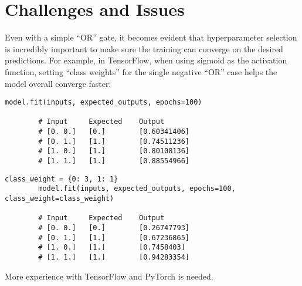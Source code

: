 \documentclass{article}
\begin{document}
    \section*{Challenges and Issues}
    Even with a simple ``OR'' gate, it becomes evident that hyperparameter selection is incredibly important to make
    sure the training can converge on the desired predictions.
    For example, in TensorFlow, when using sigmoid as the activation function, setting ``class weights'' for the single
    negative ``OR'' case helps the model overall converge faster:

    \begin{lstlisting}[caption=Without class weights]
        model.fit(inputs, expected_outputs, epochs=100)

        # Input     Expected	Output
        # [0. 0.]   [0.]        [0.60341406]
        # [0. 1.]   [1.]        [0.74511236]
        # [1. 0.]   [1.]        [0.80108136]
        # [1. 1.]   [1.]        [0.88554966]
    \end{lstlisting}

    \begin{lstlisting}[caption=With class weights]
        class_weight = {0: 3, 1: 1}
        model.fit(inputs, expected_outputs, epochs=100, class_weight=class_weight)

        # Input	    Expected	Output
        # [0. 0.]	[0.]	    [0.26747793]
        # [0. 1.]	[1.]	    [0.67236865]
        # [1. 0.]	[1.]	    [0.7458403]
        # [1. 1.]	[1.]	    [0.94283354]
    \end{lstlisting}

    More experience with TensorFlow and PyTorch is needed.

%
%
    
    
\end{document}
